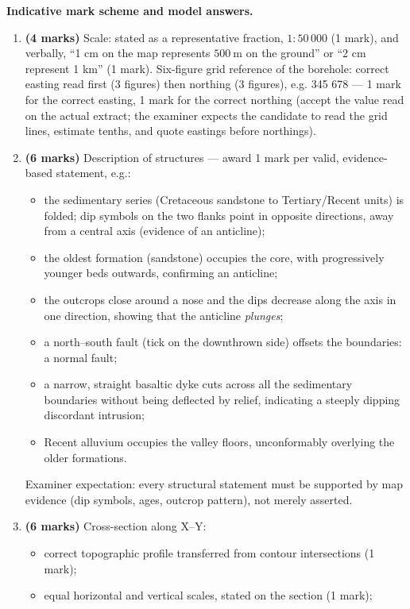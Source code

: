 \documentclass[11pt]{article}
\begin{document}
\begin{corrige}
\textbf{Indicative mark scheme and model answers.}
\begin{enumerate}
\item \textbf{(4 marks)} Scale: stated as a representative fraction, $1:50\,000$ (1 mark), and verbally, ``1 cm on the map represents $500\ \mathrm{m}$ on the ground'' or ``2 cm represent 1 km'' (1 mark). Six-figure grid reference of the borehole: correct easting read first (3 figures) then northing (3 figures), e.g. 345 678 — 1 mark for the correct easting, 1 mark for the correct northing (accept the value read on the actual extract; the examiner expects the candidate to read the grid lines, estimate tenths, and quote eastings before northings).
\item \textbf{(6 marks)} Description of structures — award 1 mark per valid, evidence-based statement, e.g.:
\begin{itemize}
\item the sedimentary series (Cretaceous sandstone to Tertiary/Recent units) is folded; dip symbols on the two flanks point in opposite directions, away from a central axis (evidence of an anticline);
\item the oldest formation (sandstone) occupies the core, with progressively younger beds outwards, confirming an anticline;
\item the outcrops close around a nose and the dips decrease along the axis in one direction, showing that the anticline \emph{plunges};
\item a north--south fault (tick on the downthrown side) offsets the boundaries: a normal fault;
\item a narrow, straight basaltic dyke cuts across all the sedimentary boundaries without being deflected by relief, indicating a steeply dipping discordant intrusion;
\item Recent alluvium occupies the valley floors, unconformably overlying the older formations.
\end{itemize}
Examiner expectation: every structural statement must be supported by map evidence (dip symbols, ages, outcrop pattern), not merely asserted.
\item \textbf{(6 marks)} Cross-section along X--Y:
\begin{itemize}
\item correct topographic profile transferred from contour intersections (1 mark);
\item equal horizontal and vertical scales, stated on the section (1 mark);

\end{itemize}
\end{enumerate}
\end{corrige}
\end{document}
